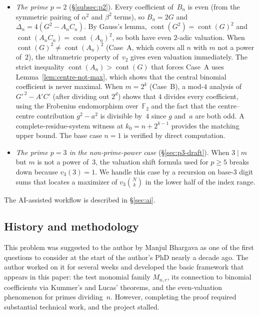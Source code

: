 \documentclass[10pt]{amsart}
\theoremstyle{definition}
\theoremstyle{remark}
\DeclareMathOperator{\cont}{cont}
\newcommand{\BF}{\mathbb{F}}
\begin{document}
\begin{itemize}
\item \emph{The prime $p = 2$}
  \textup{(\S\ref{subsec:p2}).}\enspace
  Every coefficient of~$B_n$ is even
  (from the symmetric pairing of $\alpha^2$ and $\beta^2$ terms),
  so $B_n = 2G$ and $\Delta_n = 4(G^2 - A_nC_n)$.
  By Gauss's lemma, $\cont(G^2) = \cont(G)^2$ and
  $\cont(A_nC_n) = \cont(A_n)^2$, so both have even $2$-adic
  valuation.  When $\cont(G)^2 \ne \cont(A_n)^2$ (Case~A, which
  covers all $n$ with $m$ not a power of~$2$), the ultrametric
  property of~$v_2$ gives even valuation immediately.  The
  strict inequality $\cont(A_n) > \cont(G)$ that forces Case~A
  uses Lemma~\ref{lem:centre-not-max}, which shows that the
  central binomial coefficient is never maximal.
  When $m = 2^k$ (Case~B), a mod-$4$ analysis of
  $G'^{\,2} - A'C'$ (after dividing out $2^d$) shows that $4$
  divides every coefficient, using the Frobenius endomorphism
  over~$\BF_2$ and the fact that the centre--centre contribution
  $g^2 - a^2$ is divisible by~$4$ since $g$ and~$a$ are both odd.
  A complete-residue-system witness at $k_0 = n + 2^{k-1}$
  provides the matching upper bound.
  The base case $n = 1$ is verified by direct computation.

\item \emph{The prime $p = 3$ in the non-prime-power case}
  \textup{(\S\ref{sec:p3-draft}).}\enspace
  When $3 \mid m$ but $m$ is not a power of~$3$, the valuation
  shift formula used for $p \ge 5$ breaks down because
  $v_3(3) = 1$.  We handle this case by a recursion on base-$3$
  digit sums that locates a maximizer of $v_3\binom{N}{k}$ in the
  lower half of the index range.
\end{itemize}

\noindent
The AI-assisted workflow is described in \S\ref{sec:ai}.

\subsection{History and methodology}\label{subsec:history}

This problem was suggested to the author by Manjul Bhargava as one of the
first questions to consider at the start of the author's PhD nearly a
decade ago.  The author worked on it for several weeks and developed the
basic framework that appears in this paper: the test monomial family
$M_{n,r}$, its connection to binomial coefficients via Kummer's and
Lucas' theorems, and the even-valuation phenomenon for primes
dividing~$n$.  However, completing the proof required substantial
technical work, and the project stalled.
\end{document}

